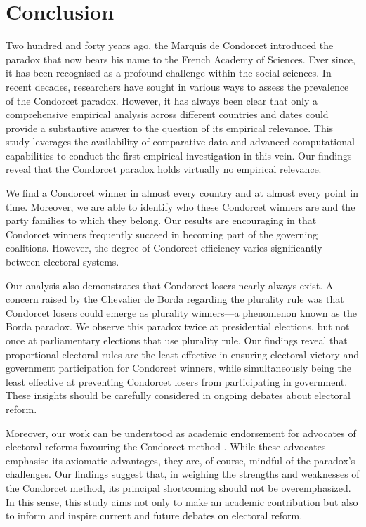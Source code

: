 \documentclass[12pt]{scrartcl}
\begin{document}
\section{Conclusion}
Two hundred and forty years ago, the Marquis de Condorcet introduced the paradox that now bears his name to the French Academy of Sciences. Ever since, it has been recognised as a profound challenge within the social sciences. In recent decades, researchers have sought in various ways to assess the prevalence of the Condorcet paradox. However, it has always been clear that only a comprehensive empirical analysis across different countries and dates could provide a substantive answer to the question of its empirical relevance. This study leverages the availability of comparative data and advanced computational capabilities to conduct the first empirical investigation in this vein. Our findings reveal that the Condorcet paradox holds virtually no empirical relevance.

We find a Condorcet winner in almost every country and at almost every point in time. Moreover, we are able to identify who these Condorcet winners are and the party families to which they belong. Our results are encouraging in that Condorcet winners frequently succeed in becoming part of the governing coalitions. However, the degree of Condorcet efficiency varies significantly between electoral systems.

Our analysis also demonstrates that Condorcet losers nearly always exist. A concern raised by the Chevalier de Borda regarding the plurality rule was that Condorcet losers could emerge as plurality winners—a phenomenon known as the Borda paradox. We observe this paradox twice at presidential elections, but not once at parliamentary elections that use plurality rule. Our findings reveal that proportional electoral rules are the least effective in ensuring electoral victory and government participation for Condorcet winners, while simultaneously being the least effective at preventing Condorcet losers from participating in government. These insights should be carefully considered in ongoing debates about electoral reform.

Moreover, our work can be understood as academic endorsement for advocates of electoral reforms favouring the Condorcet method \citep{Maskin2016, Maskin2017, Maskin2017a}. While these advocates emphasise its axiomatic advantages, they are, of course, mindful of the paradox's challenges. Our findings suggest that, in weighing the strengths and weaknesses of the Condorcet method, its principal shortcoming should not be overemphasized. In this sense, this study aims not only to make an academic contribution but also to inform and inspire current and future debates on electoral reform.
\end{document}
